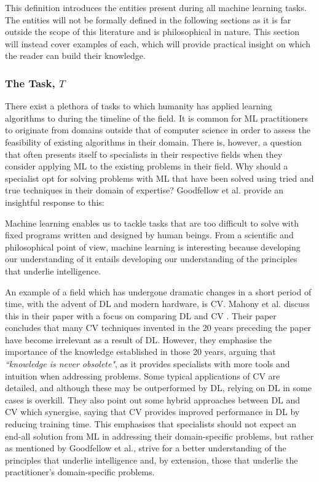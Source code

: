 This definition introduces the entities present during all
machine learning tasks. The entities will not be formally defined in the
following sections as it is far outside the scope of this literature and is
philosophical in nature. This section will instead cover examples of each, which
will provide practical insight on which the reader can build their knowledge.

\subsubsection{The Task, $T$}
There exist a plethora of tasks to which humanity has applied learning algorithms to during the timeline of the field. It is common for \gls{ML} practitioners to originate from domains outside that of computer science in order to assess the feasibility of existing algorithms in their domain. There is, however, a question that often presents itself to specialists in their respective fields when they consider applying \gls{ML} to the existing problems in their field. Why should a specialist opt for solving problems with \gls{ML} that have been solved using tried and true techniques in their domain of expertise? Goodfellow et al. \cite{Goodfellow-et-al-2016} provide an insightful response to this:

\begin{fancyquotes}
    Machine learning enables us to tackle tasks that are too difficult
    to solve with fixed programs written and designed by human beings. From a
    scientific and philosophical point of view, machine learning is interesting
    because developing our understanding of it entails developing our
    understanding of the principles that underlie intelligence.
\end{fancyquotes}

An example of a field which has undergone dramatic changes in a short period of
time, with the advent of \gls{DL} and modern hardware, is \gls{CV}. Mahony et
al. discuss this in their paper with a focus on comparing \gls{DL} and \gls{CV}
\cite{Mahony-et-al-2020}. Their paper concludes that many \gls{CV} techniques
invented in the 20 years preceding the paper have become irrelevant as a result
of \gls{DL}. However, they emphasise the importance of the knowledge
established in those 20 years, arguing that \textit{``knowledge is never
obsolete"}, as it provides specialists with more tools and intuition when
addressing problems. Some typical applications of \gls{CV} are detailed, and
although these may be outperformed by \gls{DL}, relying on \gls{DL} in some
cases is overkill. They also point out some hybrid approaches between \gls{DL}
and \gls{CV} which synergise, saying that \gls{CV} provides improved performance
in \gls{DL} by reducing training time. This emphasises that specialists should
not expect an end-all solution from \gls{ML} in addressing their domain-specific
problems, but rather as mentioned by Goodfellow et al., strive for a better
understanding of the principles that underlie intelligence and, by extension,
those that underlie the practitioner's domain-specific problems.

